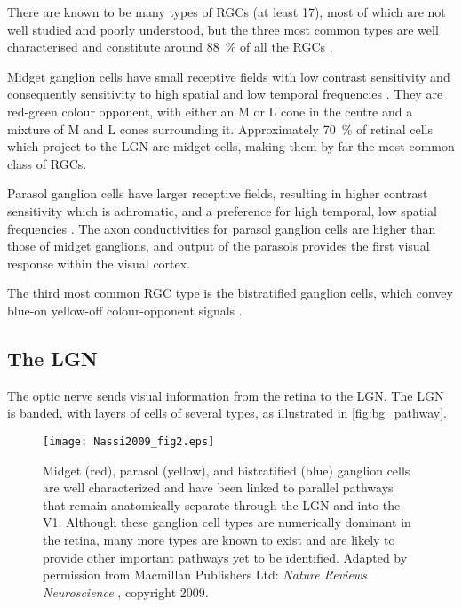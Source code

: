 There are known to be many types of \acp{RGC} (at least \num{17}), most of which are not well studied and poorly understood, but the three most common types are well characterised and constitute around \SI{88}{\percent} of all the \acp{RGC} \citep{Nassi2009}.

Midget ganglion cells have small receptive fields with low contrast sensitivity and consequently sensitivity to high spatial and low temporal frequencies \citep{Nassi2009}.
They are red-green colour opponent, with either an \ac{M} or \ac{L} cone in the centre and a mixture of \ac{M} and \ac{L} cones surrounding it.
Approximately \SI{70}{\percent} of retinal cells which project to the \ac{LGN} are midget cells, making them by far the most common class of \acp{RGC}.

Parasol ganglion cells have larger receptive fields, resulting in higher contrast sensitivity which is achromatic, and a preference for high temporal, low spatial frequencies \citep{Nassi2009}.
The axon conductivities for parasol ganglion cells are higher than those of midget ganglions, and output of the parasols provides the first visual response within the visual cortex.

The third most common \ac{RGC} type is the bistratified ganglion cells, which convey blue-on yellow-off colour-opponent signals \citep{Nassi2009}.



\subsection{The \acl{LGN}}

The optic nerve sends visual information from the retina to the \acf{LGN}.
The \ac{LGN} is banded, with layers of cells of several types, as illustrated in \autoref{fig:bg_pathway}.

\begin{figure}[htb]
\centering
\texttt{[image: Nassi2009\_fig2.eps]}
\caption{
Midget (red), parasol (yellow), and bistratified (blue) ganglion cells are well characterized and have been linked to parallel pathways that remain anatomically separate through the \ac{LGN} and into the \ac{V1}.
Although these ganglion cell types are numerically dominant in the retina, many more types are known to exist and are likely to provide other important pathways yet to be identified.
Adapted by permission from Macmillan Publishers Ltd: \textit{Nature Reviews Neuroscience} \citep{Nassi2009}, copyright 2009.
}
\label{fig:bg_pathway}
\end{figure}

